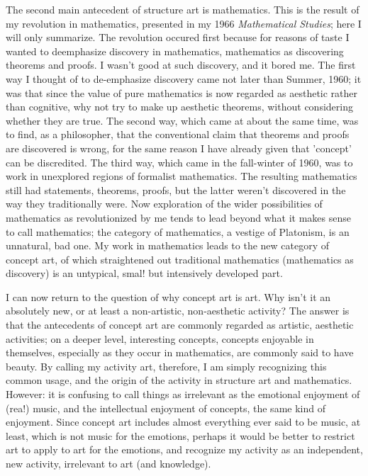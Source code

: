 \documentclass[10pt,twoside,draft]{memoir}
\newcommand{\essaytitle}[1]{
	\emph{#1}}
\begin{document}
{{The second main antecedent of structure art is mathematics. This is the 
result of my revolution in mathematics, presented in my 1966 \essaytitle{Mathematical 
Studies}; here I will only summarize. The revolution occured first because for 
reasons of taste I wanted to deemphasize discovery in mathematics, 
mathematics as discovering theorems and proofs. I wasn't good at such 
discovery, and it bored me. The first way I thought of to de-emphasize 
discovery came not later than Summer, 1960; it was that since the value of 
pure mathematics is now regarded as aesthetic rather than cognitive, why not 
try to make up aesthetic theorems, without considering whether they are 
true. The second way, which came at about the same time, was to find, as a 
philosopher, that the conventional claim that theorems and proofs are 
discovered is wrong, for the same reason I have already given that 'concept' 
can be discredited. The third way, which came in the fall-winter of 1960, 
was to work in unexplored regions of formalist mathematics. The resulting 
mathematics still had statements, theorems, proofs, but the latter weren't 
discovered in the way they traditionally were. Now exploration of the wider 
possibilities of mathematics as revolutionized by me tends to lead beyond 
what it makes sense to call mathematics; the category of mathematics, a 
vestige of Platonism, is an unnatural, bad one. My work in mathematics leads 
to the new category of concept art, of which straightened out traditional 
mathematics (mathematics as discovery) is an untypical, smal! but 
intensively developed part. 

I can now return to the question of why concept art is art. Why isn't it an 
absolutely new, or at least a non-artistic, non-aesthetic activity? The answer 
is that the antecedents of concept art are commonly regarded as artistic, 
aesthetic activities; on a deeper level, interesting concepts, concepts 
enjoyable in themselves, especially as they occur in mathematics, are 
commonly said to have beauty. By calling my activity art, therefore, I am 
simply recognizing this common usage, and the origin of the activity in 
structure art and mathematics. However: it is confusing to call things as 
irrelevant as the emotional enjoyment of (rea!) music, and the intellectual 
enjoyment of concepts, the same kind of enjoyment. Since concept art 
includes almost everything ever said to be music, at least, which is not music 
for the emotions, perhaps it would be better to restrict art to apply to art for 
the emotions, and recognize my activity as an independent, new activity, 
irrelevant to art (and knowledge). 

}}
\end{document}
